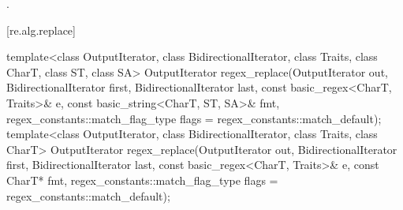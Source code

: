 \begin{itemdescr}
\pnum
\returns
{}.
\end{itemdescr}

[re.alg.replace]{}

%
\begin{itemdecl}
template<class OutputIterator, class BidirectionalIterator,
         class Traits, class CharT, class ST, class SA>
  OutputIterator
    regex_replace(OutputIterator out,
                  BidirectionalIterator first, BidirectionalIterator last,
                  const basic_regex<CharT, Traits>& e,
                  const basic_string<CharT, ST, SA>& fmt,
                  regex_constants::match_flag_type flags = regex_constants::match_default);
template<class OutputIterator, class BidirectionalIterator, class Traits, class CharT>
  OutputIterator
    regex_replace(OutputIterator out,
                  BidirectionalIterator first, BidirectionalIterator last,
                  const basic_regex<CharT, Traits>& e,
                  const CharT* fmt,
                  regex_constants::match_flag_type flags = regex_constants::match_default);
\end{itemdecl}

